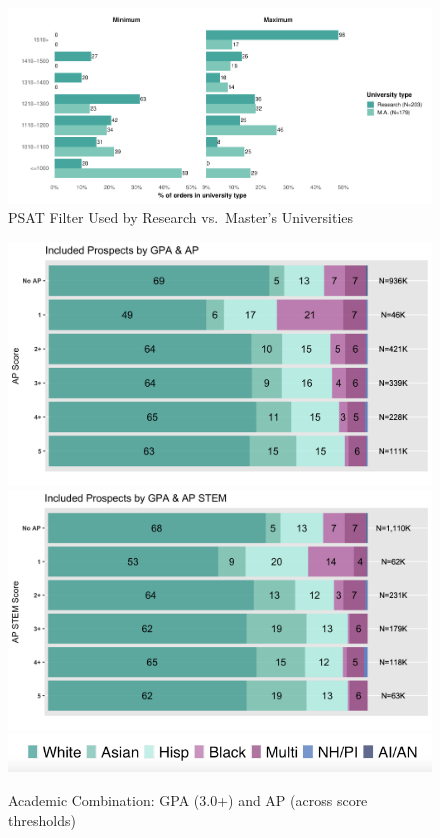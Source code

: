\documentclass[
  12pt,
]{article}
\begin{document}
\pagebreak

\begin{figure}
\centering
\includegraphics{eepa_student_list_manuscript_c_a_files/figure-latex/orders-psat-1.pdf}
\caption{\label{fig:orders-psat}PSAT Filter Used by Research vs.~Master's Universities}
\end{figure}

\pagebreak

\begin{figure}

{\centering \includegraphics[width=0.8\linewidth]{./../../outputs/figures/combo3_inc_apv2} \includegraphics[width=0.8\linewidth]{./../../outputs/figures/combo3_inc_apstemv2} \includegraphics[width=0.8\linewidth]{./../../outputs/figures/legend_horizontal} 

}

\caption{Academic Combination: GPA (3.0+) and AP (across score thresholds)}\label{fig:gpa-ap}
\end{figure}
\end{document}
